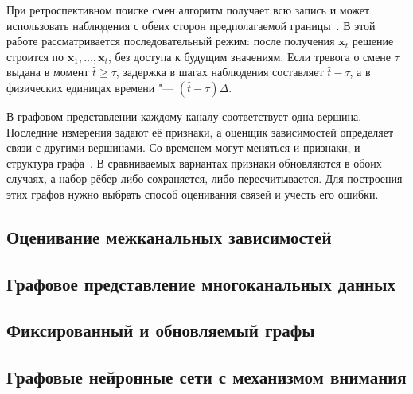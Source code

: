 \documentclass[bachelor, och, diploma]{SCWorks}
\begin{document}
При ретроспективном поиске смен алгоритм получает всю запись и может использовать наблюдения с обеих сторон предполагаемой границы~\cite{truong2020review}. В этой работе рассматривается последовательный режим: после получения $\mathbf{x}_t$ решение строится по $\mathbf{x}_1,\ldots,\mathbf{x}_t$, без доступа к будущим значениям. Если тревога о смене $\tau$ выдана в момент $\widehat{t}\geq\tau$, задержка в шагах наблюдения составляет $\widehat{t}-\tau$, а в физических единицах времени "--- $(\widehat{t}-\tau)\Delta$.

В графовом представлении каждому каналу соответствует одна вершина. Последние измерения задают её признаки, а оценщик зависимостей определяет связи с другими вершинами. Со временем могут меняться и признаки, и структура графа~\cite{rahman2024primer}. В сравниваемых вариантах признаки обновляются в обоих случаях, а набор рёбер либо сохраняется, либо пересчитывается. Для построения этих графов нужно выбрать способ оценивания связей и учесть его ошибки.


\subsection{Оценивание межканальных зависимостей}

\subsection{Графовое представление многоканальных данных}

\subsection{Фиксированный и обновляемый графы}

\subsection{Графовые нейронные сети с механизмом внимания}
\end{document}
